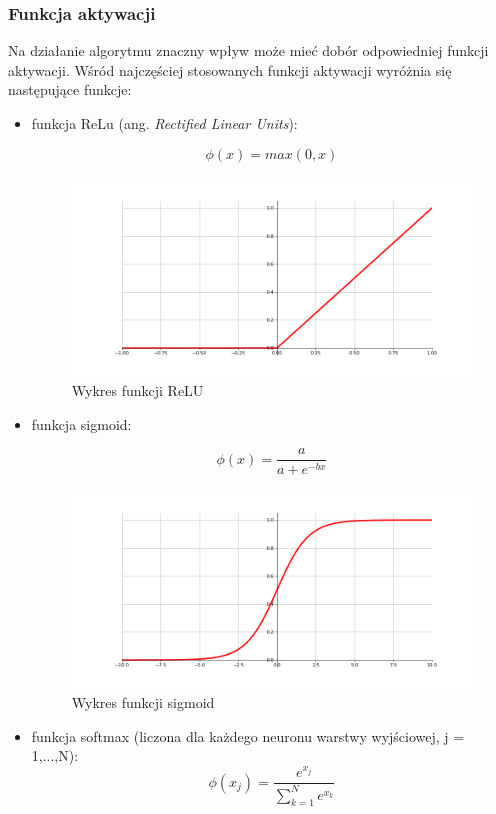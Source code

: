 \subsubsection{Funkcja aktywacji}
Na działanie algorytmu znaczny wpływ może mieć dobór odpowiedniej 
funkcji aktywacji. Wśród najczęściej stosowanych funkcji aktywacji
wyróżnia się następujące funkcje:
\begin{itemize}
    \item funkcja ReLu (ang. \emph{Rectified Linear Units}): 
    
    $$\phi(x) = max(0, x)$$
    
    \begin{figure}[!h]
      \centering
      \includegraphics[width=\textwidth]{img/relu.png}
      \caption{Wykres funkcji ReLU}
      \label{relu}
    \end{figure}

    \item funkcja sigmoid: 
    
    $$\phi(x) = \frac{a}{a + e^{-bx}}$$
    
    \begin{figure}[!h]
      \centering
      \includegraphics[width=\textwidth]{img/sigmoid.png}
      \caption{Wykres funkcji sigmoid}
      \label{sigmoid}
    \end{figure}
    
    \item funkcja softmax (liczona dla każdego neuronu warstwy wyjściowej, j = 1,...,N): 
    $$\phi(x_j) = \frac{e^{x_j}}{\sum_{k=1}^{N}{e^{x_k}}}$$
\end{itemize}

